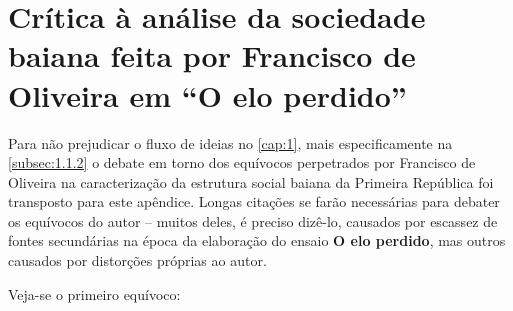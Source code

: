 \chapter{Crítica à análise da sociedade baiana feita por Francisco de\\ Oliveira em ``O elo perdido''}\label{ap:2}

Para não prejudicar o fluxo de ideias no \autoref{cap:1}, mais especificamente na \autoref{subsec:1.1.2} o debate em torno dos equívocos perpetrados por Francisco de Oliveira na caracterização da estrutura social baiana da Primeira República foi transposto para este apêndice. Longas citações se farão necessárias para debater os equívocos do autor -- muitos deles, é preciso dizê-lo, causados por escassez de fontes secundárias na época da elaboração do ensaio \textbf{O elo perdido}, mas outros causados por distorções próprias ao autor.

Veja-se o primeiro equívoco:

